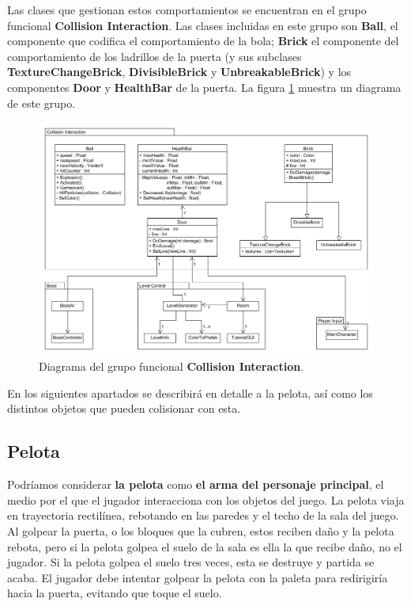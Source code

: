 Las clases que gestionan estos comportamientos se encuentran en el grupo funcional \textbf{Collision Interaction}. Las clases incluidas en este grupo son \textbf{Ball}, el componente que codifica el comportamiento de la bola; \textbf{Brick} el componente del comportamiento de los ladrillos de la puerta (y sus subclases \textbf{TextureChangeBrick}, \textbf{DivisibleBrick} y \textbf{UnbreakableBrick}) y los componentes \textbf{Door} y \textbf{HealthBar} de la puerta. La figura \ref{diagrama_clases_collision} muestra un diagrama de este grupo.
\begin{figure}[h]
    \centering
    \includegraphics[width=1\textwidth]{images/estructura/fisica/class_diagram}
    \caption{Diagrama del grupo funcional \textbf{Collision Interaction}.}
    \label{diagrama_clases_collision}
\end{figure}

En los siguientes apartados se describirá en detalle a la pelota, así como los distintos objetos que pueden colisionar con esta.

\subsection{Pelota}
Podríamos considerar \textbf{la pelota} como \textbf{el arma del personaje principal}, el medio por el que el jugador interacciona con los objetos del juego. La pelota viaja en trayectoria rectilínea, rebotando en las paredes y el techo de la sala del juego. Al golpear la puerta, o los bloques que la cubren, estos reciben daño y la pelota rebota, pero si la pelota golpea el suelo de la sala es ella la que recibe daño, no el jugador. Si la pelota golpea el suelo tres veces, esta se destruye y partida se acaba. El jugador debe intentar golpear la pelota con la paleta para redirigiría hacia la puerta, evitando que toque el suelo.

